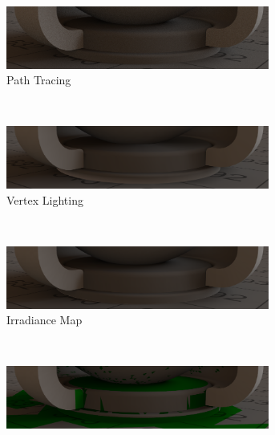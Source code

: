 		\begin{figure}[h]
			\begin{subfigure}[t]{\textwidth}
				\center
				\includegraphics[width=0.95\textwidth]{pic/irrmap-shaderball_e2-ref.png}
				\caption{Path Tracing}
				\label{subfig:irrmap-shaderball-e2-ref}
			\end{subfigure}
			\medskip \\
			\begin{subfigure}[t]{\textwidth}
				\center
				\includegraphics[width=0.95\textwidth]{pic/irrmap-shaderball_e2-vmap.png}
				\caption{Vertex Lighting}
				\label{subfig:irrmap-shaderball-e2-vmap}
			\end{subfigure}
			\medskip \\
			\begin{subfigure}[t]{\textwidth}
				\center
				\includegraphics[width=0.95\textwidth]{pic/irrmap-shaderball_e2-irrmap.png}
				\caption{Irradiance Map}
				\label{subfig:irrmap-shaderball-e2-irrmap}
			\end{subfigure}
			\medskip \\
			\begin{subfigure}[t]{\textwidth}
				\center
				\includegraphics[width=0.95\textwidth]{pic/irrmap-shaderball_e2-irrmap-order.png}

\end{subfigure}
\end{figure}
